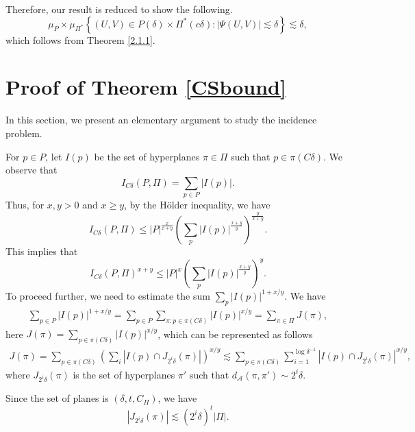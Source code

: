 \documentclass[11pt]{article}
\newcommand{\1}{\mathbf{1}}
\begin{document}
Therefore, our result is reduced to show the following.
\[\mu_P\times \mu_{\Pi^*}\left\lbrace (U, V)\in P(\delta)\times \Pi^*(c\delta)\colon |\Psi(U, V)|\lesssim \delta \right\rbrace\lesssim \delta,\]
which follows from Theorem \ref{2.1.1}.


\section{Proof of Theorem \ref{CSbound}}
In this section, we present an elementary argument to study the incidence problem. 

For $p\in P$, let $I(p)$ be the set of hyperplanes $\pi\in \Pi$ such that $p\in \pi(C\delta)$. We observe that
\[I_{C\delta}(P, \Pi)=\sum_{p\in P}|I(p)|.\]
Thus, for $x, y > 0$ and $x\ge y$, by the H\"{o}lder inequality, we have 
\[I_{C\delta}(P, \Pi)\le |P|^{\frac{x}{x+y}}\left(\sum_{p}|I(p)|^{\frac{x+y}{y}}\right)^{\frac{y}{x+y}}.\]
This implies that 
\[I_{C\delta}(P, \Pi)^{x+y}\le |P|^{x}\left(\sum_{p}|I(p)|^{\frac{x+y}{y}}\right)^{y}.\]
To proceed further, we need to estimate the sum $\sum_{p}|I(p)|^{1+x/y}$. 
We have 
\begin{align*}
    \sum_{p\in P}|I(p)|^{1+x/y}=\sum_{p\in P}\sum_{\pi\colon p\in \pi(C\delta)}|I(p)|^{x/y}=\sum_{\pi\in \Pi}J(\pi),
\end{align*}
here $J(\pi)=\sum_{p\in \pi(C\delta)}|I(p)|^{x/y}$, which can be represented as follows
\begin{align*}
    J(\pi)=\sum_{p\in \pi(C\delta)}\left(\sum_{i}|I(p)\cap J_{2^i\delta}(\pi)
|\right)^{x/y} \lesssim \sum_{p\in \pi(C\delta)} \sum_{i=1}^{\log \delta^{-1}}|I(p)\cap J_{2^i\delta}(\pi)|^{x/y},
\end{align*}
where $J_{2^i\delta}(\pi)$ is the set of hyperplanes $\pi'$ such that $d_{\mathcal{A}}(\pi, \pi')\sim 2^i\delta$.

Since the set of planes is $(\delta, t, C_\Pi)$, we have 
\[|J_{2^i\delta}(\pi)| \lesssim (2^i \delta)^t|\Pi|.\]
\end{document}
